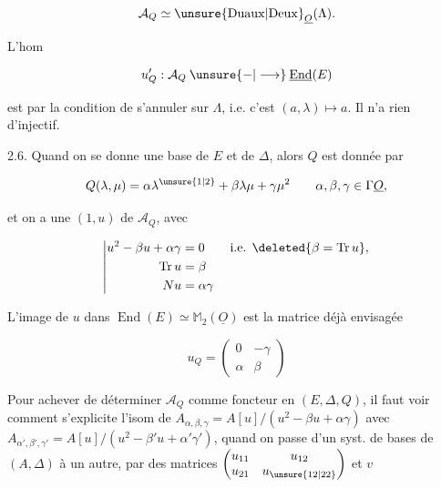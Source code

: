 
\[
\mathcal A_Q\simeq\operatorname{\unsure{Duaux|Deux}}_{\underline O}(\Lambda).
\]

L'hom

\[
u'_Q:\mathcal A_Q\mathbin{\unsure{-|\longrightarrow}}\underline{\operatorname{End}}(E)
\]

est  par la condition  de s'annuler sur $\Lambda$, i.e. c'est $(a,\lambda)\longmapsto a$.  Il n'a rien d'injectif.

2.6. Quand on se donne une base de $E$ et de $\Delta$, alors $Q$ est donnée par

\[
Q(\lambda,\mu)=\alpha\lambda^{\unsure{1|2}}+\beta\lambda\mu+\gamma\mu^2
\qquad\alpha,\beta,\gamma\in\Gamma\underline O,
\]

et on  a une  $(1,u)$ de $\mathcal A_Q$, avec

\[
\left|\begin{aligned}
u^2-\beta u+\alpha\gamma&=0\qquad\text{i.e. }\deleted{\beta=\operatorname{Tr}u},\\
\operatorname{Tr}u&=\beta\\
Nu&=\alpha\gamma
\end{aligned}\right.
\]

L'image de $u$ dans $\operatorname{End}(E)\simeq\mathbb M_2(\underline O)$ est la matrice déjà envisagée

\[
u_Q=\begin{pmatrix}0&-\gamma\\\alpha&\beta\end{pmatrix}
\]

Pour achever de déterminer $\mathcal A_Q$ comme foncteur en $(E,\Delta,Q)$, il faut voir comment s'explicite l'isom de $A_{\alpha,\beta,\gamma}=A[u]/(u^2-\beta u+\alpha\gamma)$ avec $A_{\alpha',\beta',\gamma'}=A[u]/(u^2-\beta'u+\alpha'\gamma')$, quand on passe d'un syst. de bases de $(A,\Delta)$ à un autre, par des matrices $\begin{pmatrix}u_{11}&u_{12}\\u_{21}&u_{\unsure{12|22}}\end{pmatrix}$ et $v$ 
